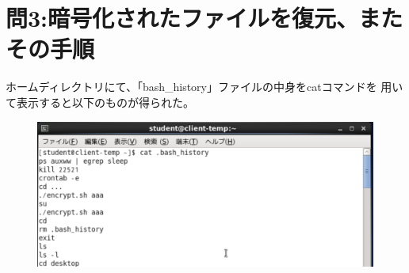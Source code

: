 \documentclass[dvipdfmx,autodetect-engine,titlepage]{jsarticle}
\begin{document}
\begin{figure}[h]
\begin{minipage}[b]{0.45\linewidth}
\begin{center}
    \end{center}
    \caption{}
  \end{minipage}
\end{figure}

\section{問3:暗号化されたファイルを復元、またその手順}

ホームディレクトリにて、「bash\_history」ファイルの中身をcatコマンドを
用いて表示すると以下のものが得られた。

\begin{figure}[h]
  \centering
  \includegraphics[scale=0.6]{pic5.png}
  \caption{}
\end{figure}
\end{document}
